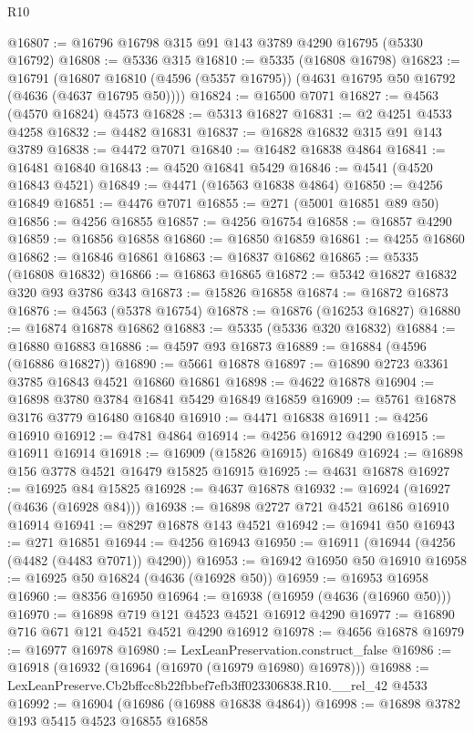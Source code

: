 \begin{lexlean}{R10}
\begin{coremodule}
@16807 := @16796 @16798 @315 @91 @143 @3789 @4290 @16795 (@5330 @16792)
@16808 := @5336 @315
@16810 := @5335 (@16808 @16798)
@16823 := @16791
    (@16807 @16810 (@4596 (@5357 @16795)) (@4631 @16795 @50 @16792 (@4636 (@4637 @16795 @50))))
@16824 := @16500 @7071
@16827 := @4563 (@4570 @16824) @4573
@16828 := @5313 @16827
@16831 := @2 @4251 @4533 @4258
@16832 := @4482 @16831
@16837 := @16828 @16832 @315 @91 @143 @3789
@16838 := @4472 @7071
@16840 := @16482 @16838 @4864
@16841 := @16481 @16840
@16843 := @4520 @16841 @5429
@16846 := @4541 (@4520 @16843 @4521)
@16849 := @4471 (@16563 @16838 @4864)
@16850 := @4256 @16849
@16851 := @4476 @7071
@16855 := @271 (@5001 @16851 @89 @50)
@16856 := @4256 @16855
@16857 := @4256 @16754
@16858 := @16857 @4290
@16859 := @16856 @16858
@16860 := @16850 @16859
@16861 := @4255 @16860
@16862 := @16846 @16861
@16863 := @16837 @16862
@16865 := @5335 (@16808 @16832)
@16866 := @16863 @16865
@16872 := @5342 @16827 @16832 @320 @93 @3786 @343
@16873 := @15826 @16858
@16874 := @16872 @16873
@16876 := @4563 (@5378 @16754)
@16878 := @16876 (@16253 @16827)
@16880 := @16874 @16878 @16862
@16883 := @5335 (@5336 @320 @16832)
@16884 := @16880 @16883
@16886 := @4597 @93 @16873
@16889 := @16884 (@4596 (@16886 @16827))
@16890 := @5661 @16878
@16897 := @16890 @2723 @3361 @3785 @16843 @4521 @16860 @16861
@16898 := @4622 @16878
@16904 := @16898 @3780 @3784 @16841 @5429 @16849 @16859
@16909 := @5761 @16878 @3176 @3779 @16480 @16840
@16910 := @4471 @16838
@16911 := @4256 @16910
@16912 := @4781 @4864
@16914 := @4256 @16912 @4290
@16915 := @16911 @16914
@16918 := @16909 (@15826 @16915) @16849
@16924 := @16898 @156 @3778 @4521 @16479 @15825 @16915
@16925 := @4631 @16878
@16927 := @16925 @84 @15825
@16928 := @4637 @16878
@16932 := @16924 (@16927 (@4636 (@16928 @84)))
@16938 := @16898 @2727 @721 @4521 @6186 @16910 @16914
@16941 := @8297 @16878 @143 @4521
@16942 := @16941 @50
@16943 := @271 @16851
@16944 := @4256 @16943
@16950 := @16911 (@16944 (@4256 (@4482 (@4483 @7071)) @4290))
@16953 := @16942 @16950 @50 @16910
@16958 := @16925 @50 @16824 (@4636 (@16928 @50))
@16959 := @16953 @16958
@16960 := @8356 @16950
@16964 := @16938 (@16959 (@4636 (@16960 @50)))
@16970 := @16898 @719 @121 @4523 @4521 @16912 @4290
@16977 := @16890 @716 @671 @121 @4521 @4521 @4290 @16912
@16978 := @4656 @16878
@16979 := @16977 @16978
@16980 := LexLeanPreservation.construct_false
@16986 := @16918 (@16932 (@16964 (@16970 (@16979 @16980) @16978)))
@16988 := LexLeanPreserve.Cb2bffcc8b22fbbef7efb3ff023306838.R10.__rel_42 @4533
@16992 := @16904 (@16986 (@16988 @16838 @4864))
@16998 := @16898 @3782 @193 @5415 @4523 @16855 @16858

\end{coremodule}
\end{lexlean}

